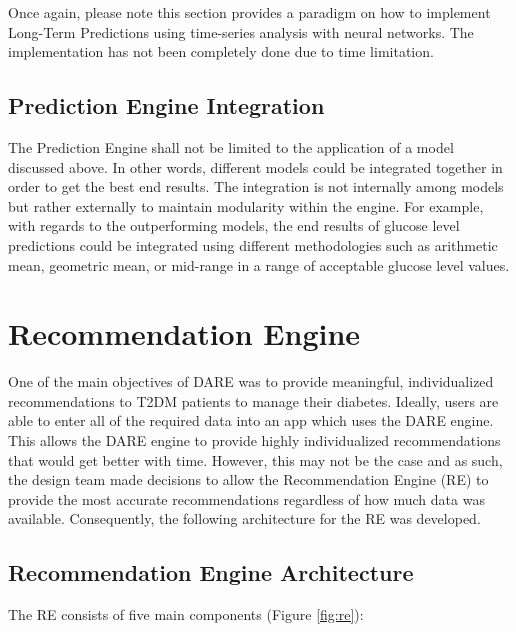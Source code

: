 Once again, please note this section provides a paradigm on how to implement Long-Term Predictions using time-series analysis with neural networks. The implementation has not been completely done due to time limitation.

\subsection{Prediction Engine Integration}

The Prediction Engine shall not be limited to the application of a model discussed above. In other words, different models could be integrated together in order to get the best end results. The integration is not internally among models but rather externally to maintain modularity within the engine. For example, with regards to the outperforming models, the end results of glucose level predictions could be integrated using different methodologies such as arithmetic mean, geometric mean, or mid-range in a range of acceptable glucose level values.









\section{Recommendation Engine}
\label{sec:recommendation_engine}
One of the main objectives of DARE was to provide meaningful, individualized recommendations to T2DM patients to manage their diabetes. Ideally, users are able to enter all of the required data into an app which uses the DARE engine. This allows the DARE engine to provide highly individualized recommendations that would get better with time. However, this may not be the case and as such, the design team made decisions to allow the Recommendation Engine (RE) to provide the most accurate recommendations regardless of how much data was available. Consequently, the following architecture for the RE was developed.

\subsection{Recommendation Engine Architecture}
\label{subsec:re_architecture}
The RE consists of five main components (Figure \ref{fig:re}):


